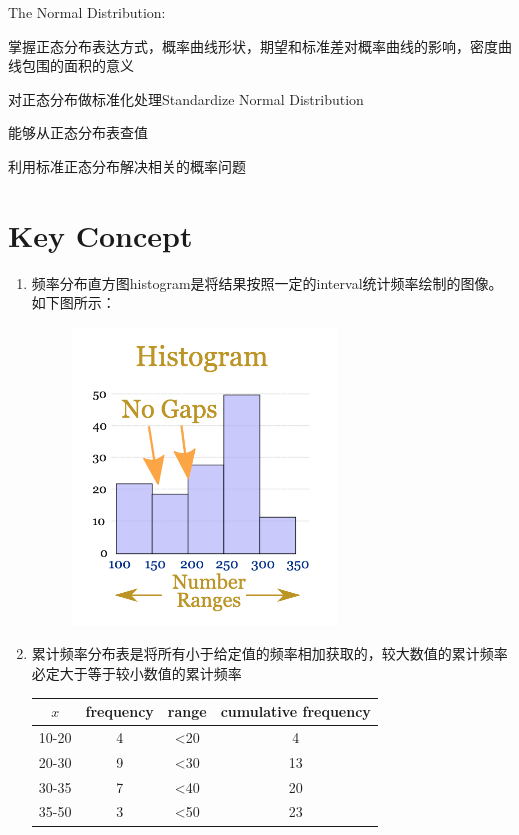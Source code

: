 The Normal Distribution:
\begin{todolist}
\item 掌握正态分布表达方式，概率曲线形状，期望和标准差对概率曲线的影响，密度曲线包围的面积的意义
\item 对正态分布做标准化处理Standardize Normal Distribution
\item 能够从正态分布表查值
\item 利用标准正态分布解决相关的概率问题
\end{todolist}
\clearpage


\section{Key Concept}
\begin{enumerate}
\item 频率分布直方图histogram是将结果按照一定的interval统计频率绘制的图像。如下图所示：
\begin{figure}[H]
\centering
\includegraphics[width=200pt]{auximage/histogram.png}
\end{figure}
\item 累计频率分布表是将所有小于给定值的频率相加获取的，较大数值的累计频率必定大于等于较小数值的累计频率
\begin{table}[H]
\centering
\begin{tabular}{|c|c|c|c|}
\hline
$x$   & frequency & range         & cumulative frequency \\ \hline
10-20 & 4         & \textless{}20 & 4                    \\ \hline
20-30 & 9         & \textless{}30 & 13                   \\ \hline
30-35 & 7         & \textless{}40 & 20                   \\ \hline
35-50 & 3         & \textless{}50 & 23                   \\ \hline
\end{tabular}
\end{table}


\end{enumerate}
